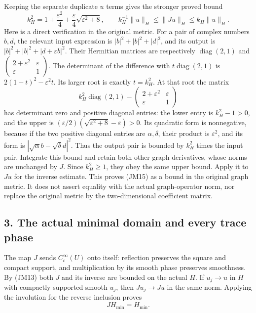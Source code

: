 \documentclass[
  11pt,
]{article}
\begin{document}
Keeping the separate duplicate \(u\) terms gives the
stronger proved bound \[
 k_H^2=1+\frac{\varepsilon^2}{4}
                 +\frac{\varepsilon}{4}\sqrt{\varepsilon^2+8},
 \qquad k_H^{-1}\|u\|_H\leq\|Ju\|_H\leq k_H\|u\|_H.
 \tag{JM15}
\] Here is a direct
verification in the original metric. For a pair of complex numbers
\(b,d\), the relevant input expression is
\(|b|^2+|b|^2+|d|^2\), and its output is \(|b|^2+|b|^2+|d+\varepsilon b|^2\).
Their Hermitian matrices are respectively \(\operatorname{diag}(2,1)\) and
\(\begin{pmatrix}2+\varepsilon^2&\varepsilon\\\varepsilon&1\end{pmatrix}\). The determinant of the difference with
\(t\operatorname{diag}(2,1)\) is \(2(1-t)^2-\varepsilon^2t\). Its larger root is
exactly \(t=k_H^2\). At that root the matrix
\[
 k_H^2\operatorname{diag}(2,1)-
       \begin{pmatrix}2+\varepsilon^2&\varepsilon\\\varepsilon&1\end{pmatrix}
\] has determinant zero and positive diagonal
entries: the lower entry is \(k_H^2-1>0\), and the upper is
\((\varepsilon/2)(\sqrt{\varepsilon^2+8}-\varepsilon)>0\). Its quadratic form is nonnegative, because if
the two positive diagonal entries are \(\alpha,\delta\), their
product is \(\varepsilon^2\), and its form is
\(|\sqrt\alpha b-\sqrt\delta d|^2\). Thus the output pair is bounded by
\(k_H^2\) times the input pair. Integrate this bound and
retain both other graph derivatives, whose norms are unchanged by
\(J\). Since \(k_H^2\geq1\), they obey the
same upper bound. Apply it to \(Ju\) for the inverse
estimate. This proves (JM15) as a bound in the original graph metric. It
does not assert equality with the actual graph-operator norm, nor
replace the original metric by the two-dimensional coefficient matrix.

\subsection{3. The actual minimal domain and every trace
phase}\label{the-actual-minimal-domain-and-every-trace-phase}

The map \(J\) sends \(C_c^\infty(U)\) onto
itself: reflection preserves the square and compact support, and
multiplication by its smooth phase preserves smoothness. By (JM13) both
\(J\) and its inverse are bounded on the actual
\(H\). If \(u_j\to u\) in
\(H\) with compactly supported smooth
\(u_j\), then \(Ju_j\to Ju\) in the same norm.
Applying the involution for the reverse inclusion proves
\[
 JH_{\min}=H_{\min}.
 \tag{JM16}
\]
\end{document}
